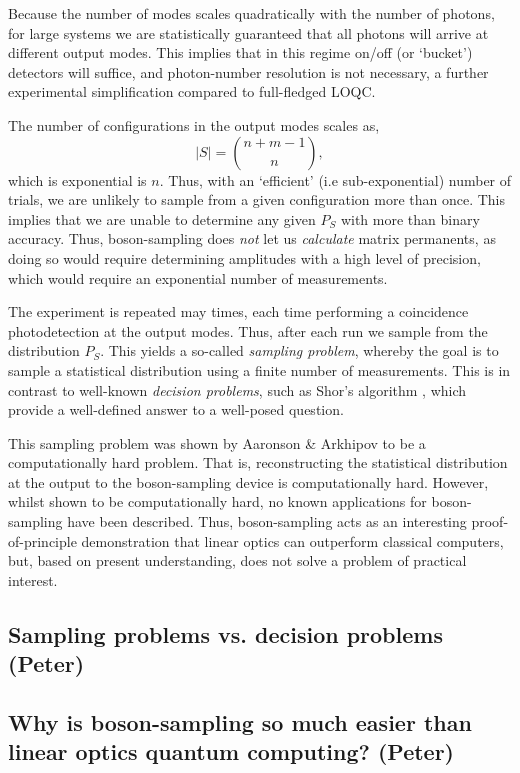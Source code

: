 \documentclass[aps,pra,twocolumn,amsmath,amssymb,nofootinbib,superscriptaddress]{revtex4}
\begin{document}
Because the number of modes scales quadratically with the number of photons, for large systems we are statistically guaranteed that all photons will arrive at different output modes. This implies that in this regime on/off (or `bucket') detectors will suffice, and photon-number resolution is not necessary, a further experimental simplification compared to full-fledged LOQC.

The number of configurations in the output modes scales as,
\begin{equation}
|S| = \binom{n+m-1}{n},
\end{equation}
which is exponential is $n$. Thus, with an `efficient' (i.e sub-exponential) number of trials, we are unlikely to sample from a given configuration more than once. This implies that we are unable to determine any given $P_S$ with more than binary accuracy. Thus, boson-sampling does \emph{not} let us \emph{calculate} matrix permanents, as doing so would require determining amplitudes with a high level of precision, which would require an exponential number of measurements.

The experiment is repeated may times, each time performing a coincidence photodetection at the output modes. Thus, after each run we sample from the distribution $P_S$. This yields a so-called \emph{sampling problem}, whereby the goal is to sample a statistical distribution using a finite number of measurements. This is in contrast to well-known \emph{decision problems}, such as Shor's algorithm \cite{bib:Shor97}, which provide a well-defined answer to a well-posed question.

This sampling problem was shown by Aaronson \& Arkhipov to be a computationally hard problem. That is, reconstructing the statistical distribution at the output to the boson-sampling device is computationally hard. However, whilst shown to be computationally hard, no known applications for boson-sampling have been described. Thus, boson-sampling acts as an interesting proof-of-principle demonstration that linear optics can outperform classical computers, but, based on present understanding, does not solve a problem of practical interest.

\subsection{Sampling problems vs. decision problems (Peter)}

\subsection{Why is boson-sampling so much easier than linear optics quantum computing? (Peter)}
\end{document}

